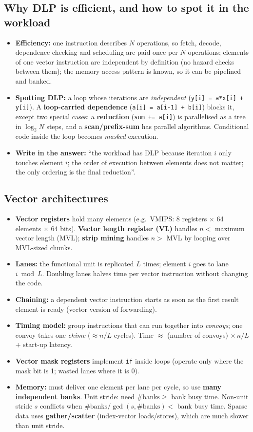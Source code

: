 \subsection{Why DLP is efficient, and how to spot it in the workload}
\begin{itemize}
\item \textbf{Efficiency:} one instruction describes $N$ operations, so fetch, decode, dependence checking and scheduling are paid once per $N$ operations; elements of one vector instruction are independent by definition (no hazard checks between them); the memory access pattern is known, so it can be pipelined and banked.
\item \textbf{Spotting DLP:} a loop whose iterations are \emph{independent} (\texttt{y[i] = a*x[i] + y[i]}). A \textbf{loop-carried dependence} (\texttt{a[i] = a[i-1] + b[i]}) blocks it, except two special cases: a \textbf{reduction} (\texttt{sum += a[i]}) is parallelised as a tree in $\log_2 N$ steps, and a \textbf{scan/prefix-sum} has parallel algorithms. Conditional code inside the loop becomes \emph{masked} execution.
\item \textbf{Write in the answer:} ``the workload has DLP because iteration $i$ only touches element $i$; the order of execution between elements does not matter; the only ordering is the final reduction''.
\end{itemize}

\subsection{Vector architectures}
\begin{itemize}
\item \textbf{Vector registers} hold many elements (e.g.\ VMIPS: 8 registers $\times$ 64 elements $\times$ 64 bits). \textbf{Vector length register (VL)} handles $n<$ maximum vector length (MVL); \textbf{strip mining} handles $n>$ MVL by looping over MVL-sized chunks.
\item \textbf{Lanes:} the functional unit is replicated $L$ times; element $i$ goes to lane $i \bmod L$. Doubling lanes halves time per vector instruction without changing the code.
\item \textbf{Chaining:} a dependent vector instruction starts as soon as the first result element is ready (vector version of forwarding).
\item \textbf{Timing model:} group instructions that can run together into \emph{convoys}; one convoy takes one \emph{chime} ($\approx n/L$ cycles). Time $\approx$ (number of convoys) $\times\, n/L$ + start-up latency.
\item \textbf{Vector mask registers} implement \texttt{if} inside loops (operate only where the mask bit is 1; wasted lanes where it is 0).
\item \textbf{Memory:} must deliver one element per lane per cycle, so use \textbf{many independent banks}. Unit stride: need $\#\text{banks} \ge$ bank busy time. Non-unit stride $s$ conflicts when $\#\text{banks}/\gcd(s,\#\text{banks}) <$ bank busy time. Sparse data uses \textbf{gather/scatter} (index-vector loads/stores), which are much slower than unit stride.
\end{itemize}


